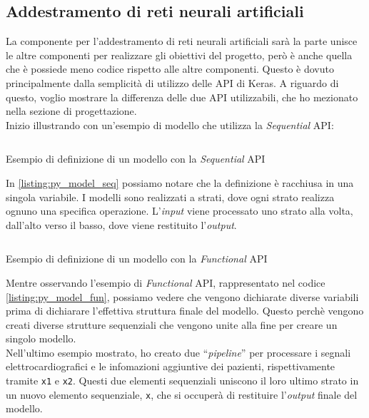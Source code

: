 \subsection{Addestramento di reti neurali artificiali}\noindent
La componente per l'addestramento di reti neurali artificiali sarà la parte unisce le altre componenti per realizzare gli obiettivi del progetto, però è anche quella che è possiede meno codice rispetto alle altre componenti.
Questo è dovuto principalmente dalla semplicità di utilizzo delle API di Keras. A riguardo di questo, voglio mostrare la differenza delle due API utilizzabili, che ho mezionato nella sezione di progettazione.\\
Inizio illustrando con un'esempio di modello che utilizza la \textit{Sequential} API:
\begin{listing}[H]
    \inputminted{python}{code/model_sequential.py}
    \caption{Esempio di definizione di un modello con la \textit{Sequential} API}
    \label{listing:py_model_seq}
\end{listing}\noindent
In \ref{listing:py_model_seq} possiamo notare che la definizione è racchiusa in una singola variabile. I modelli sono realizzati a strati, dove ogni strato realizza ognuno una specifica operazione.
L'\textit{input} viene processato uno strato alla volta, dall'alto verso il basso, dove viene restituito l'\textit{output}.\\
\begin{listing}[H]
    \inputminted{python}{code/model_functional.py}
    \caption{Esempio di definizione di un modello con la \textit{Functional} API}
    \label{listing:py_model_fun}
\end{listing}\noindent
Mentre osservando l'esempio di \textit{Functional} API, rappresentato nel codice \ref{listing:py_model_fun}, possiamo vedere che vengono dichiarate diverse variabili prima di dichiarare l'effettiva struttura finale del modello.
Questo perchè vengono creati diverse strutture sequenziali che vengono unite alla fine per creare un singolo modello.\\
Nell'ultimo esempio mostrato, ho creato due ``\textit{pipeline}'' per processare i segnali elettrocardiografici e le infomazioni aggiuntive dei pazienti, rispettivamente tramite \texttt{x1} e \texttt{x2}.
Questi due elementi sequenziali uniscono il loro ultimo strato in un nuovo elemento sequenziale, \texttt{x}, che si occuperà di restituire l'\textit{output} finale del modello.

